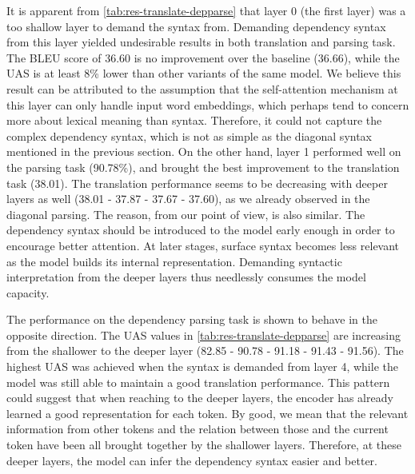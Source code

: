 It is apparent from \cref{tab:res-translate-depparse} that layer 0 (the first layer) was a too shallow layer to demand the syntax from.
Demanding dependency syntax from this layer yielded undesirable results in both translation and parsing task.
The BLEU score of 36.60 is no improvement over the baseline (36.66), while the UAS is at least 8\% lower than other variants of the same model.
We believe this result can be attributed to the assumption that the self-attention mechanism at this layer can only handle input word embeddings, which perhaps tend to concern more about lexical meaning than syntax.
Therefore, it could not capture the complex dependency syntax, which is not as simple as the diagonal syntax mentioned in the previous section.
On the other hand, layer 1 performed well on the parsing task (90.78\%), and brought the best improvement to the translation task (38.01).
The translation performance seems to be decreasing with deeper layers as well (38.01 - 37.87 - 37.67 - 37.60), as we already observed in the diagonal parsing.
The reason, from our point of view, is also similar.
The dependency syntax should be introduced to the model early enough in order to encourage better attention.
At later stages, surface syntax becomes less relevant as the model builds its internal representation.
Demanding syntactic interpretation from the deeper layers thus needlessly consumes the model capacity.

The performance on the dependency parsing task is shown to behave in the opposite direction.
The UAS values in \cref{tab:res-translate-depparse} are increasing from the shallower to the deeper layer (82.85 - 90.78 - 91.18 - 91.43 - 91.56).
The highest UAS was achieved when the syntax is demanded from layer 4, while the model was still able to maintain a good translation performance.
This pattern could suggest that when reaching to the deeper layers, the encoder has already learned a good representation for each token.
By good, we mean that the relevant information from other tokens and the relation between those and the current token have been all brought together by the shallower layers.
Therefore, at these deeper layers, the model can infer the dependency syntax easier and better.

